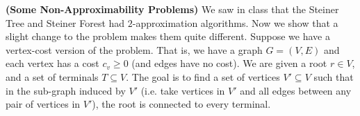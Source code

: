 \documentclass[solution,addpoints,12pt]{exam}
\begin{document}
\begin{questions}
\question[20] \textbf{(Some Non-Approximability Problems)}  We saw in class that the Steiner Tree and Steiner Forest had $2$-approximation algorithms. Now we show that a slight change to the problem makes them quite different. Suppose we have a vertex-cost version of the problem. That is, we have a graph $G = (V,E)$ and each vertex has a cost $c_v \geq 0$ (and edges have no cost). We are given a root $r \in V$, and a set of terminals $T \subseteq V$. The goal is to find a set of vertices $V' \subseteq V$ such that in the sub-graph induced by $V'$ (i.e. take vertices in $V'$ and all edges between any pair of vertices in $V'$), the root is connected to every terminal.


\end{questions}
\end{document}
